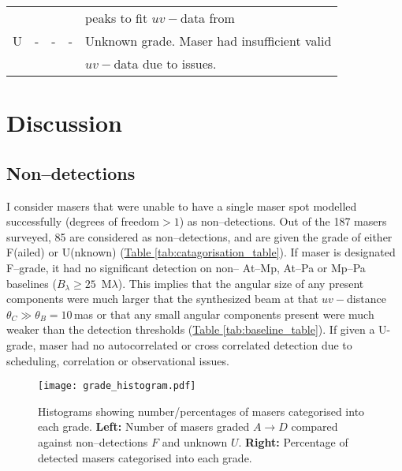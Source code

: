 \begin{table}[H]
{\begin{tabular}{ccccl}
                           &                          &                          &                           &peaks to fit $uv-$data from  \\\hdashline
                 U         &   -                      &   -                      &                       -   &Unknown grade. Maser had insufficient valid \\
                           &                          &                          &                           &$uv-$data due to issues.   \\
                \bottomrule
            \end{tabular}}
        \end{table}
\section{Discussion}
    
    \subsection{Non--detections} 
        \label{nondetections}
        I consider masers that were unable to have a single maser spot modelled successfully (degrees of freedom$>1$) as non--detections. Out of the 187 masers surveyed, 85 are considered as non--detections, and are given the grade of either F(ailed) or U(nknown) (\hyperref[tab:catagorisation_table]{Table \ref*{tab:catagorisation_table}}). If maser is designated F--grade, it had no significant detection on non-- At--Mp, At--Pa or Mp--Pa baselines ($B_\lambda\ge25$~M$\lambda$). This implies that the angular size of any present components were much larger that the synthesized beam at that $uv-$distance $\theta_C\gg\theta_B=10$\,mas or that any small angular components present were much weaker than the detection thresholds (\hyperref[tab:baseline_table]{Table \ref*{tab:baseline_table}}). If given a U-grade, maser had no autocorrelated or cross correlated detection due to scheduling, correlation or observational issues.
        
        \begin{figure}[H]
        \centering
        \texttt{[image: grade\_histogram.pdf]}
        \caption[Maser catagory populations]{Histograms showing number/percentages of masers categorised into each grade. {\bf Left:} Number of masers graded $A\rightarrow D$ compared against non--detections $F$ and unknown $U$. {\bf Right:} Percentage of detected masers categorised into each grade.}
        \label{fig:compact_gradehistogram}
        \end{figure}
    
